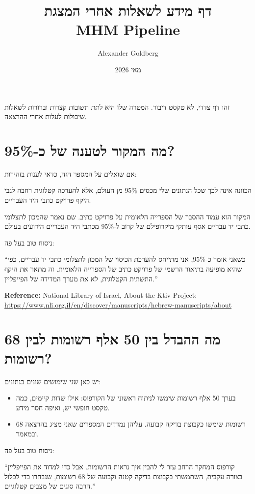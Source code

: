 \documentclass[12pt,a4paper]{article}
\title{\texthebrew{דף מידע לשאלות אחרי המצגת}\\[4pt]\large MHM Pipeline}
\author{Alexander Goldberg}
\date{\texthebrew{מאי 2026}}
\begin{document}
\maketitle

\begin{hebrew}
זהו דף צדדי, לא טקסט דיבור. המטרה שלו היא לתת תשובות קצרות וברורות לשאלות שיכולות לעלות אחרי ההרצאה.
\end{hebrew}

\section{\texthebrew{מה המקור לטענה של כ-95\%?}}
\begin{hebrew}
אם שואלים על המספר הזה, כדאי לענות בזהירות:
\par
הכוונה אינה לכך שכל הנתונים שלי מכסים 95\% מן העולם, אלא להערכה קטלוגית רחבה לגבי היקף פרויקט כתבי היד העבריים.
\par
המקור הוא עמוד ההסבר של הספרייה הלאומית על פרויקט כתיב. שם נאמר שהמכון לתצלומי כתבי יד עבריים אסף עותקי מיקרופילם של קרוב ל-95\% מכתבי היד העבריים הידועים בעולם.
\par
ניסוח טוב בעל פה:
\par
``כשאני אומר כ-95\%, אני מתייחס להערכת הכיסוי של המכון לתצלומי כתבי יד עבריים, כפי שהיא מופיעה בתיאור הרשמי של פרויקט כתיב של הספרייה הלאומית. זה מתאר את היקף התשתית הקטלוגית, לא את מערך המדידה של הפייפליין.''
\par
\textbf{Reference:} National Library of Israel, About the Ktiv Project:
\url{https://www.nli.org.il/en/discover/manuscripts/hebrew-manuscripts/about}
\end{hebrew}

\section{\texthebrew{מה ההבדל בין 50 אלף רשומות לבין 68 רשומות?}}
\begin{hebrew}
יש כאן שני שימושים שונים בנתונים:
\begin{itemize}
  \item בערך 50 אלף רשומות שימשו לניתוח ראשוני של הקורפוס: אילו שדות קיימים, כמה טקסט חופשי יש, ואיפה חסר מידע.
  \item 68 רשומות שימשו כקבוצת בדיקה קבועה. עליהן נמדדים המספרים שאני מציג בהרצאה ובמאמר.
\end{itemize}
\par
ניסוח טוב בעל פה:
\par
``קורפוס המחקר הרחב עזר לי להבין איך נראות הרשומות. אבל כדי למדוד את הפייפליין בצורה עקבית, השתמשתי בקבוצת בדיקה קטנה וקבועה של 68 רשומות, שנבחרו כדי לכלול הרבה סוגים של מצבים קטלוגיים.''
\end{hebrew}
\end{document}
